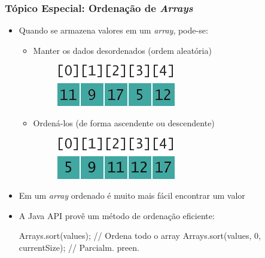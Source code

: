 \documentclass[xcolor={dvipsnames,table},aspectratio=169]{beamer}
\begin{document}
\begin{frame}[fragile]\frametitle{Tópico Especial: Ordenação de \emph{Arrays}}
\begin{itemize}
	\item Quando se armazena valores em um \emph{array}, pode-se:
	\begin{itemize}
		\item Manter os dados desordenados (ordem aleatória)
\begin{figure}[h]
	\includegraphics[height=0.10\paperheight,center]{pucrs-ep-fprog-unidade_06-arrays-laminas-ordenacao_1.png}
\end{figure}
		\item Ordená-los (de forma ascendente ou descendente)
\begin{figure}[h]
	\includegraphics[height=0.10\paperheight,center]{pucrs-ep-fprog-unidade_06-arrays-laminas-ordenacao_2.png}
\end{figure}
	\end{itemize}
	\item Em um \emph{array} ordenado é muito mais fácil encontrar um valor
	\item A Java API provê um método de ordenação eficiente:
{\scriptsize
\begin{javacode}
Arrays.sort(values);      // Ordena todo o array
Arrays.sort(values, 0, currentSize);  // Parcialm. preen.
\end{javacode}
}
\end{itemize}
\end{frame}
\end{document}

